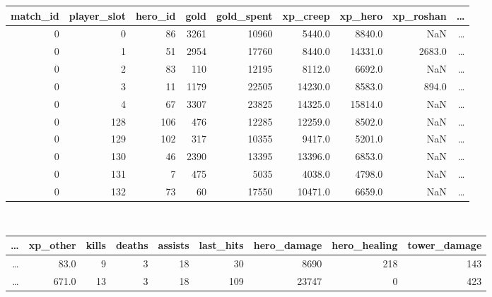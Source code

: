 \documentclass[a4paper,12pt,openany,oneside]{book}
\begin{document}
\begin{table}[ht]
	\scriptsize	
	\centering	
			\begin{tabularx}{0.82\textwidth}{rrrrrrrrr}
                match\_id & player\_slot & hero\_id & gold & gold\_spent & xp\_creep & xp\_hero & xp\_roshan & \dots \\
                \midrule                                                                
                0     &       0    &   86 & 3261   &    10960  &  5440.0 &  8840.0   &     NaN               & \dots \\
                0     &      1    &   51 & 2954   &    17760  &  8440.0 & 14331.0  &   2683.0                & \dots \\
                0     &       2    &   83  & 110    &   12195  &  8112.0  & 6692.0    &    NaN               & \dots \\
                0     &       3    &   11 & 1179    &   22505  & 14230.0 &  8583.0   &   894.0               & \dots \\
                0     &      4   &    67 & 3307   &    23825 &  14325.0 & 15814.0    &    NaN                & \dots \\
                0     &     128  &   106 &  476   &    12285 &  12259.0 &  8502.0    &    NaN                & \dots \\
                0     &     129  &    102 &   317   &    10355  &  9417.0 &  5201.0   &     NaN              & \dots \\
                0     &     130  &     46 & 2390    &   13395 &  13396.0 &  6853.0    &    NaN               & \dots \\
                0     &     131  &      7 &  475    &    5035  &  4038.0 &  4798.0    &    NaN               & \dots \\
                0     &     132  &     73  &  60    &   17550  & 10471.0 &  6659.0 & NaN                          & \dots 
			\end{tabularx}
			\\[3.0em]
			\begin{tabularx}{0.855\textwidth}{rrrrrrrrr}
                \dots & xp\_other & kills & deaths & assists & last\_hits & hero\_damage & hero\_healing & tower\_damage \\
                \midrule
                \dots &  83.0   &   9   &    3   &    18    &     30    &     8690     &      218       &    143  \\
                \dots &  671.0   &  13   &    3   &    18    &    109    &    23747     &        0       &    423  \\

\end{tabularx}
\end{table}
\end{document}

